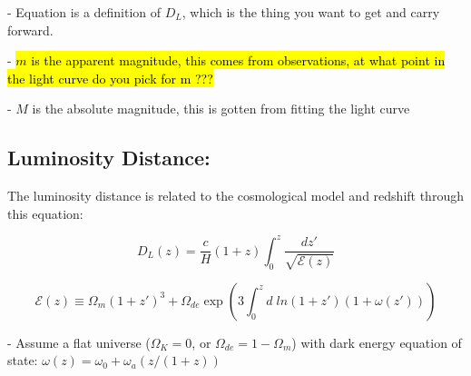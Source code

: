 \documentclass{article}
\begin{document}
- Equation is a definition of $D_L$, which is the thing you want to get and carry forward. 

- \hl{$m$ is the apparent magnitude, this comes from observations, at what point in the light curve do you pick for m ???} 

- $M$ is the absolute magnitude, this is gotten from fitting the light curve 

\subsection{Luminosity Distance:}

The luminosity distance is related to the cosmological model and redshift through this equation:

\begin{equation}
D_{L}(z) = \frac{c}{H}(1 + z) \int_{0}^{z} \frac{dz'}{\sqrt{\mathcal{E}(z)}}
\end{equation}

\begin{equation}
\mathcal{E}(z) \equiv \Omega_m(1+z')^3 + \Omega_{de} \exp(3 \int^z_0 d \; ln(1+z')(1+\omega (z')))
\end{equation}

- Assume a flat universe ($\Omega_K = 0$, or $\Omega_{de} = 1 - \Omega_m$) with dark energy equation of state: $\omega(z) = \omega_0 + \omega_a(z/(1+z))$
\end{document}
